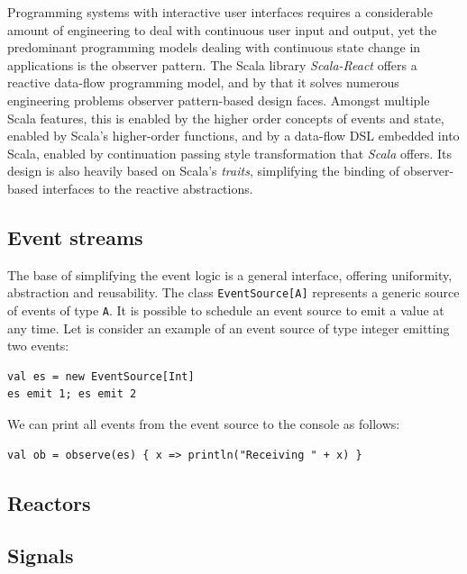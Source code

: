 Programming systems with interactive user interfaces requires a considerable amount of engineering to deal with continuous user input and output, yet the predominant programming models dealing with continuous state change in applications is the observer pattern. The Scala library \emph{Scala-React} offers a reactive data-flow programming model, and by that it solves numerous engineering problems observer pattern-based design faces. Amongst multiple Scala features, this is enabled by the higher order concepts of events and state, enabled by Scala's higher-order functions, and by a data-flow DSL embedded into Scala, enabled by continuation passing style transformation that \emph{Scala} offers. Its design is also heavily based on Scala's \emph{traits}, simplifying the binding of observer-based interfaces to the reactive abstractions.\cite{DeprecatingObservers}

\subsection{Event streams}

The base of simplifying the event logic is a general interface, offering uniformity, abstraction and reusability. The class {\tt EventSource[A]} represents a generic source of events of type {\tt A}. It is possible to schedule an event source to emit a value at any time. Let is consider an example of an event source of type integer emitting two events:
\begin{lstlisting}
val es = new EventSource[Int]
es emit 1; es emit 2
\end{lstlisting}

We can print all events from the event source to the console as follows:
\begin{lstlisting}
val ob = observe(es) { x => println("Receiving " + x) }
\end{lstlisting}

\subsection{Reactors}

\subsection{Signals}




















